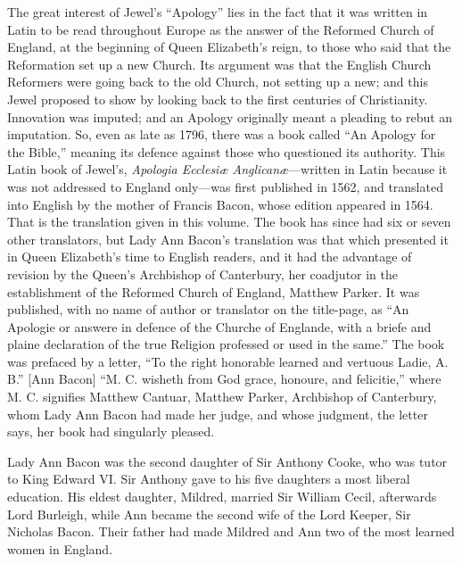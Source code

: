 
The great interest of Jewel’s “Apology” lies in
the fact that it was written in Latin to be read throughout Europe as
the answer of the Reformed Church of England, at the beginning of Queen
Elizabeth’s reign, to those who said that the Reformation set
up a new Church. Its argument was that the English Church Reformers
were going back to the old Church, not setting up a new; and this Jewel
proposed to show by looking back to the first centuries of Christianity.
Innovation was imputed; and an Apology originally meant a pleading to
rebut an imputation. So, even as late as 1796, there was a book
called “An Apology for the Bible,” meaning its defence against
those who questioned its authority. This Latin book of Jewel’s,
\emph{Apologia Ecclesiæ Anglicanæ}—written in Latin
because it was not addressed to England only—was first published
in 1562, and translated into English by the mother of Francis Bacon,
whose edition appeared in 1564. That is the translation given
in this volume. The book
has since had six or seven other translators, but Lady Ann Bacon’s
translation was that which presented it in Queen Elizabeth’s time
to English readers, and it had the advantage of revision by the Queen’s
Archbishop of Canterbury, her coadjutor in the establishment of the
Reformed Church of England, Matthew Parker. It was published,
with no name of author or translator on the title-page, as “An
Apologie or answere in defence of the Churche of Englande, with a briefe
and plaine declaration of the true Religion professed or used in the
same.” The book was prefaced by a letter, “To the
right honorable learned and vertuous Ladie, A. B.” [Ann Bacon]
“M. C. wisheth from God grace, honoure, and felicitie,”
where M. C. signifies Matthew Cantuar, Matthew Parker, Archbishop of
Canterbury, whom Lady Ann Bacon had made her judge, and whose judgment,
the letter says, her book had singularly pleased.

Lady Ann Bacon was the second daughter of Sir Anthony Cooke, who
was tutor to King Edward VI. Sir Anthony gave to his five daughters
a most liberal education. His eldest daughter, Mildred, married
Sir William Cecil, afterwards Lord Burleigh, while Ann became the second
wife of the Lord Keeper, Sir Nicholas Bacon. Their father
had made Mildred and Ann two of the most learned women in England.

